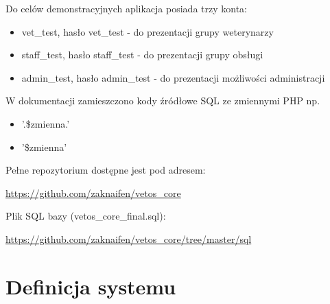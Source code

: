 \documentclass[10pt,a4paper]{article}
\begin{document}
	Do celów demonstracyjnych aplikacja posiada trzy konta:
		\begin{itemize}
			\item vet\_test, hasło vet\_test - do prezentacji grupy weterynarzy
			\item staff\_test, hasło staff\_test - do prezentacji grupy obsługi
			\item admin\_test, hasło  admin\_test - do prezentacji możliwości administracji
		\end{itemize}
	W dokumentacji zamieszczono kody źródłowe SQL ze zmiennymi PHP np. 
	\begin{itemize}
		\item '.\$zmienna.'
		\item '\$zmienna'
	\end{itemize}
		
		Pełne repozytorium dostępne jest pod adresem: 
	
	\url{https://github.com/zaknaifen/vetos_core}
	

Plik SQL bazy (vetos\_core\_final.sql):


\url{https://github.com/zaknaifen/vetos_core/tree/master/sql} 
	
	\section{Definicja systemu}
\end{document}
